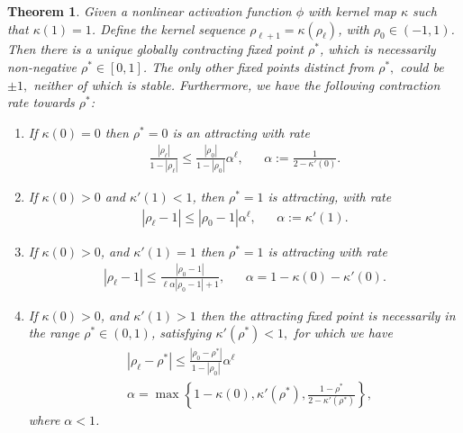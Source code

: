 \documentclass[twoside]{article}
\newtheorem{theorem}{Theorem}
\theoremstyle{definition}
\newcommand{\thomas}[1]{{\color{blue}\textit{#1}}}
\begin{document}
\begin{theorem}
\label{thm:global_attract}
Given a nonlinear activation function $\phi$ with kernel map $\kappa$ such that $\kappa(1)=1$. Define the kernel sequence $\rho_{\ell+1}=\kappa(\rho_\ell)$, with $\rho_0 \in (-1,1)$. Then there is a unique globally contracting fixed point $\rho^*$, which is necessarily non-negative $\rho^*\in[0,1]$. The only other fixed points distinct from $\rho^*,$ could be $\pm 1,$ neither of which is stable. Furthermore, we have the following contraction rate towards $\rho^*$:
\begin{enumerate}
    \item If $\kappa(0)=0$ then $\rho^*=0$ is an attracting with rate 
    \begin{align*}
    \frac{|\rho_\ell|}{1-|\rho_\ell|} \le \frac{|\rho_0|}{1-|\rho_0|} \alpha^\ell, && \alpha:=\frac{1}{2-\kappa'(0)}.
    \end{align*}
    \item If $\kappa(0)>0$ and $\kappa'(1)<1$, then $\rho^*=1$ is attracting, with rate 
    \begin{align*}
    |\rho_\ell-1| \le |\rho_0-1| \alpha ^\ell, && \alpha := \kappa'(1).
    \end{align*}
    \item If $\kappa(0) > 0$, and $\kappa'(1)=1$ then  $\rho^*=1$ is attracting with rate 
    \begin{align*}
    |\rho_\ell-1| \le \frac{|\rho_0-1|}{\ell\alpha|\rho_0-1|+1}, && \alpha = 1-\kappa(0)-\kappa'(0).
    \end{align*}
    \item If $\kappa(0) > 0$, and $\kappa'(1)>1$ then the attracting fixed point is necessarily in the range $\rho^*\in(0,1)$, satisfying $\kappa'(\rho^*) < 1,$ for which we have  
    \begin{align*}
    &|\rho_\ell-\rho^*| \le \frac{|\rho_0-\rho^*|}{1-|\rho_0|}\alpha^\ell \\ &\alpha = \max\left\{1-\kappa(0),\kappa'(\rho^*),\frac{1-\rho^*}{2-\kappa'(\rho^*)}\right\},
    \end{align*}
    where $\alpha<1$.
\end{enumerate}
\end{theorem}
\end{document}
